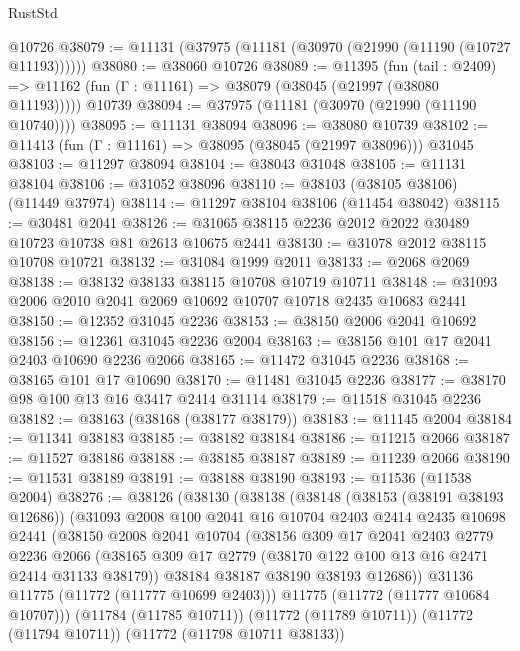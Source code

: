 \begin{lexlean}{RustStd}
\begin{coremodule}
    @10726
@38079 := @11131 (@37975 (@11181 (@30970 (@21990 (@11190 (@10727 @11193))))))
@38080 := @38060 @10726
@38089 := @11395
    (fun (tail : @2409) => @11162 (fun (Γ : @11161) => @38079 (@38045 (@21997 (@38080 @11193)))))
    @10739
@38094 := @37975 (@11181 (@30970 (@21990 (@11190 @10740))))
@38095 := @11131 @38094
@38096 := @38080 @10739
@38102 := @11413 (fun (Γ : @11161) => @38095 (@38045 (@21997 @38096))) @31045
@38103 := @11297 @38094
@38104 := @38043 @31048
@38105 := @11131 @38104
@38106 := @31052 @38096
@38110 := @38103 (@38105 @38106) (@11449 @37974)
@38114 := @11297 @38104 @38106 (@11454 @38042)
@38115 := @30481 @2041
@38126 := @31065 @38115 @2236 @2012 @2022 @30489 @10723 @10738 @81 @2613 @10675 @2441
@38130 := @31078 @2012 @38115 @10708 @10721
@38132 := @31084 @1999 @2011
@38133 := @2068 @2069
@38138 := @38132 @38133 @38115 @10708 @10719 @10711
@38148 := @31093 @2006 @2010 @2041 @2069 @10692 @10707 @10718 @2435 @10683 @2441
@38150 := @12352 @31045 @2236
@38153 := @38150 @2006 @2041 @10692
@38156 := @12361 @31045 @2236 @2004
@38163 := @38156 @101 @17 @2041 @2403 @10690 @2236 @2066
@38165 := @11472 @31045 @2236
@38168 := @38165 @101 @17 @10690
@38170 := @11481 @31045 @2236
@38177 := @38170 @98 @100 @13 @16 @3417 @2414 @31114
@38179 := @11518 @31045 @2236
@38182 := @38163 (@38168 (@38177 @38179))
@38183 := @11145 @2004
@38184 := @11341 @38183
@38185 := @38182 @38184
@38186 := @11215 @2066
@38187 := @11527 @38186
@38188 := @38185 @38187
@38189 := @11239 @2066
@38190 := @11531 @38189
@38191 := @38188 @38190
@38193 := @11536 (@11538 @2004)
@38276 := @38126
    (@38130
      (@38138
        (@38148
          (@38153 (@38191 @38193 @12686))
          (@31093
            @2008
            @100
            @2041
            @16
            @10704
            @2403
            @2414
            @2435
            @10698
            @2441
            (@38150
              @2008
              @2041
              @10704
              (@38156
                @309
                @17
                @2041
                @2403
                @2779
                @2236
                @2066
                (@38165 @309 @17 @2779 (@38170 @122 @100 @13 @16 @2471 @2414 @31133 @38179))
                @38184
                @38187
                @38190
                @38193
                @12686))
            @31136
            @11775
            (@11772 (@11777 @10699 @2403)))
          @11775
          (@11772 (@11777 @10684 @10707)))
        (@11784 (@11785 @10711))
        (@11772 (@11789 @10711))
        (@11772 (@11794 @10711))
        (@11772 (@11798 @10711 @38133))

\end{coremodule}
\end{lexlean}
